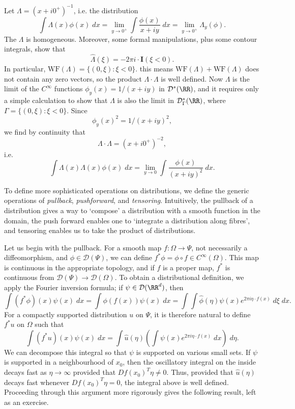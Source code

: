 \begin{example}
    Let $\Lambda = (x + i0^+)^{-1}$, i.e. the distribution
    \[ \int \Lambda(x) \phi(x)\; dx = \lim_{y \to 0^+} \int \frac{\phi(x)}{x + iy}\; dx = \lim_{y \to 0^+} \Lambda_y(\phi). \]
    The $\Lambda$ is homogeneous. Moreover, some formal manipulations, plus some contour integrals, show that
    \[ \widehat{\Lambda}(\xi) = - 2 \pi i \cdot \mathbf{I}(\xi < 0). \]
    In particular, $\text{WF}(\Lambda) = \{ (0,\xi) : \xi < 0 \}$. this means $\text{WF}(\Lambda) + \text{WF}(\Lambda)$ does not contain any zero vectors, so the product $\Lambda \cdot \Lambda$ is well defined. Now $\Lambda$ is the limit of the $C^\infty$ functions $\phi_y(x) = 1/(x + iy)$ in $\mathcal{D}^*(\RR)$, and it requires only a simple calculation to show that $\Lambda$ is also the limit in $\mathcal{D}^*_\Gamma(\RR)$, where $\Gamma = \{ (0,\xi): \xi < 0 \}$. Since
    \[ \phi_y(x)^2 = 1/(x + iy)^2, \]
    we find by continuity that
    \[ \Lambda \cdot \Lambda = (x + i0^+)^{-2}, \]
    i.e.
    \[ \int \Lambda(x) \Lambda(x) \phi(x)\; dx = \lim_{y \to 0} \int \frac{\phi(x)}{(x + iy)^2}\; dx. \]
\end{example}

To define more sophisticated operations on distributions, we define the generic operations of \emph{pullback}, \emph{pushforward}, and \emph{tensoring}. Intuitively, the pullback of a distribution gives a way to `compose' a distribution with a smooth function in the domain, the push forward enables one to `integrate a distribution along fibres', and tensoring enables us to take the product of distributions.

Let us begin with the pullback. For a smooth map $f: \Omega \to \Psi$, not necessarily a diffeomorphism, and $\phi \in \mathcal{D}(\Psi)$, we can define $f^* \phi = \phi \circ f \in C^\infty(\Omega)$. This map is continuous in the appropriate topology, and if $f$ is a proper map, $f^*$ is continuous from $\mathcal{D}(\Psi) \to \mathcal{D}(\Omega)$. To obtain a distributional definition, we apply the Fourier inversion formula; if $\psi \in \mathcal{D}(\RR^d)$, then
%
\[ \int (f^* \phi)(x) \psi(x)\; dx = \int \phi(f(x)) \psi(x)\; dx = \int \int \widehat{\phi}(\eta) \psi(x) e^{2 \pi i \eta \cdot f(x)}\; d\xi\; dx. \]
%
For a compactly supported distribution $u$ on $\Psi$, it is therefore natural to define $f^* u$ on $\Omega$ such that
%
\[ \int (f^* u)(x) \psi(x)\; dx = \int \widehat{u}(\eta) \left( \int \psi(x) e^{2 \pi i \eta \cdot f(x)}\; dx \right)\; d\eta. \]
%
We can decompose this integral so that $\psi$ is supported on various small sets. If $\psi$ is supported in a neighbourhood of $x_0$, then the oscillatory integral on the inside decays fast as $\eta \to \infty$ provided that $Df(x_0)^T \eta \neq 0$. Thus, provided that $\widehat{u}(\eta)$ decays fast whenever $Df(x_0)^T \eta = 0$, the integral above is well defined. Proceeding through this argument more rigorously gives the following result, left as an exercise.

